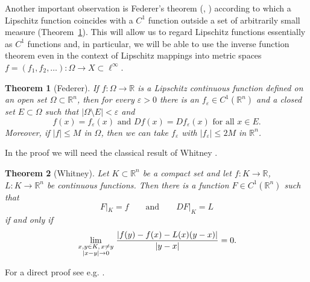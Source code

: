\documentclass[12pt,leqno]{amsart}
\newtheorem{theorem}{Theorem}
\theoremstyle{definition}
\newcommand{\bbbr}{\mathbb R}
\newcommand{\eps}{\varepsilon}
\numberwithin{theorem}{section} \numberwithin{equation}{section}
\begin{document}
Another important observation is Federer's theorem (\cite[p.\ 442]{fedsa}, \cite[Theorem~3]{whitney2}) according to which a Lipschitz function coincides with a $C^1$ function outside a set of arbitrarily small measure (Theorem~\ref{BT5}). This will allow us to regard Lipschitz functions essentially as $C^1$ functions and, in particular, we will be able to use the inverse function theorem even in the context of Lipschitz mappings into metric spaces $f=(f_1,f_2,\ldots):\Omega\to X\subset \ell^\infty$.
\begin{theorem}[Federer]
\label{BT5}
If $f:\Omega\to\bbbr$ is a Lipschitz continuous function defined on an open set $\Omega\subset\bbbr^n$, then for every $\eps>0$ there is an $f_\eps\in C^1(\bbbr^n)$
and a closed set $E\subset\Omega$ such that $|\Omega\setminus E|<\eps$ and
$$
f(x)=f_\eps(x)\text{ and } Df(x)= Df_\eps(x) \text{ for all } x\in E.
$$
Moreover, if $|f|\leq M$ in $\Omega$, then we can take $f_\eps$ with $|f_\eps|\leq 2M$ in $\bbbr^n$.
\end{theorem}
In the proof we will need the classical result of Whitney \cite{whitney}.
\begin{theorem}[Whitney]
\label{BT6}
Let $K\subset\bbbr^n$ be a compact set and let $f:K\to\bbbr$, $L:K\to\bbbr^n$
be continuous functions. Then there is a function $F\in C^1(\bbbr^n)$ such that
$$
F|_K=f
\qquad
\mbox{and}
\qquad
DF|_K=L
$$
if and only if
$$
\lim_{{\scriptstyle x,y\in K,\, x\neq y}\atop {\scriptstyle |x-y|\to 0}}
\frac{|f(y)-f(x)-L(x)(y-x)|}{|y-x|} = 0.
$$

\end{theorem}
For a direct proof see e.g. \cite[Theorem~6.10]{evans}.
\end{document}

